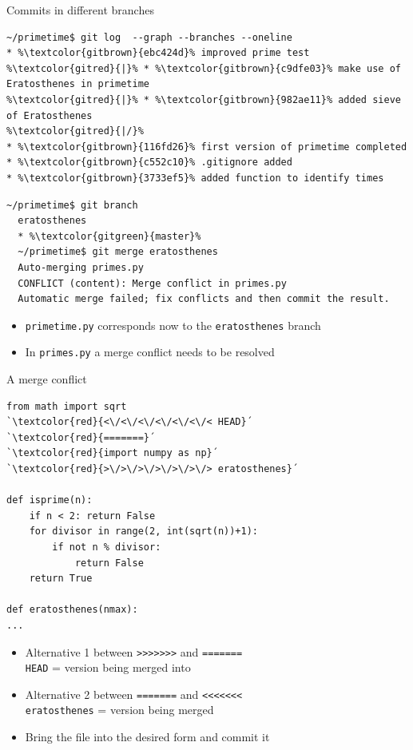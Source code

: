 \documentclass[svgnames]{beamer}
\begin{document}
\begin{frame}[fragile]{Commits in different branches}
 \addtolength\linewidth{0.5truecm}
 \begin{lstlisting}[escapechar=\%]
~/primetime$ git log  --graph --branches --oneline
* %\textcolor{gitbrown}{ebc424d}% improved prime test
%\textcolor{gitred}{|}% * %\textcolor{gitbrown}{c9dfe03}% make use of Eratosthenes in primetime
%\textcolor{gitred}{|}% * %\textcolor{gitbrown}{982ae11}% added sieve of Eratosthenes
%\textcolor{gitred}{|/}%  
* %\textcolor{gitbrown}{116fd26}% first version of primetime completed
* %\textcolor{gitbrown}{c552c10}% .gitignore added
* %\textcolor{gitbrown}{3733ef5}% added function to identify times
 \end{lstlisting}

 \vspace{0.2truecm}
 \begin{lstlisting}[escapechar=\%]
~/primetime$ git branch
  eratosthenes
  * %\textcolor{gitgreen}{master}%
  ~/primetime$ git merge eratosthenes
  Auto-merging primes.py
  CONFLICT (content): Merge conflict in primes.py
  Automatic merge failed; fix conflicts and then commit the result.
 \end{lstlisting}
 \begin{itemize}
  \item \texttt{primetime.py} corresponds now to the \texttt{eratosthenes} branch
  \item In \texttt{primes.py} a merge conflict needs to be resolved
 \end{itemize}
\end{frame}

\begin{frame}[fragile]{A merge conflict}
 \begin{lstlisting}[escapeinside=`´]
from math import sqrt
`\textcolor{red}{<\/<\/<\/<\/<\/<\/< HEAD}´
`\textcolor{red}{=======}´
`\textcolor{red}{import numpy as np}´
`\textcolor{red}{>\/>\/>\/>\/>\/>\/> eratosthenes}´

def isprime(n):
    if n < 2: return False
    for divisor in range(2, int(sqrt(n))+1):
        if not n % divisor:
            return False
    return True

def eratosthenes(nmax):
...
 \end{lstlisting}
 \begin{itemize}
  \item Alternative 1 between \texttt{>\/>\/>\/>\/>\/>\/>} and \texttt{=======}\\
	\texttt{HEAD} = version being merged into

  \item Alternative 2 between \texttt{=======} and \texttt{<\/<\/<\/<\/<\/<\/<}\\
	\texttt{eratosthenes} = version being merged
  \item Bring the file into the desired form and commit it
 \end{itemize}
\end{frame}
\end{document}
